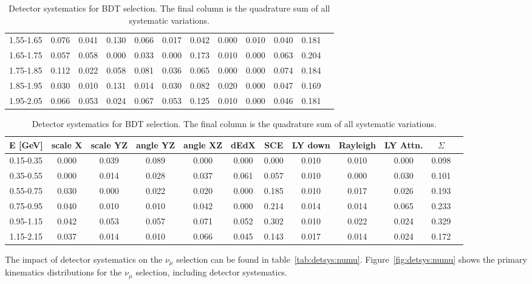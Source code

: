 \begin{table}[H]
\begin{tabular}{| c | c | c | c | c | c | c | c | c | c | c | c |}
1.55-1.65 & 0.076 & 0.041 & 0.130 & 0.066 & 0.017 & 0.042 & 0.000 & 0.010 & 0.040 &  0.181 \\
1.65-1.75 & 0.057 & 0.058 & 0.000 & 0.033 & 0.000 & 0.173 & 0.010 & 0.000 & 0.063 &  0.204 \\
1.75-1.85 & 0.112 & 0.022 & 0.058 & 0.081 & 0.036 & 0.065 & 0.000 & 0.000 & 0.074 &  0.184 \\
1.85-1.95 & 0.030 & 0.010 & 0.131 & 0.014 & 0.030 & 0.082 & 0.020 & 0.000 & 0.047 &  0.169 \\
1.95-2.05 & 0.066 & 0.053 & 0.024 & 0.067 & 0.053 & 0.125 & 0.010 & 0.000 & 0.046 &  0.181 \\
 \hline
 \end{tabular}
 \caption{\label{tab:detsys:nue:BDT} Detector systematics for BDT \npsel selection. The final column is the quadrature sum of all systematic variations.}
\end{table}



\begin{table}[H]
\centering
\small
\setlength{\tabcolsep}{3pt}
\renewcommand{\arraystretch}{1.25}
 \begin{tabular}{| c | c | c | c | c | c | c | c | c | c | c | c |} 
 \hline
E [GeV] & scale X & scale YZ & angle YZ & angle XZ & dEdX & SCE & LY down & Rayleigh & LY Attn. & $\Sigma$ \\ \hline
0.15-0.35 & 0.000 & 0.039 & 0.089 & 0.000 & 0.000 & 0.000 & 0.010 & 0.010 & 0.000 &  0.098 \\
0.35-0.55 & 0.000 & 0.014 & 0.028 & 0.037 & 0.061 & 0.057 & 0.010 & 0.000 & 0.030 &  0.101 \\
0.55-0.75 & 0.030 & 0.000 & 0.022 & 0.020 & 0.000 & 0.185 & 0.010 & 0.017 & 0.026 &  0.193 \\
0.75-0.95 & 0.040 & 0.010 & 0.010 & 0.042 & 0.000 & 0.214 & 0.014 & 0.014 & 0.065 &  0.233 \\
0.95-1.15 & 0.042 & 0.053 & 0.057 & 0.071 & 0.052 & 0.302 & 0.010 & 0.022 & 0.024 &  0.329 \\
1.15-2.15 & 0.037 & 0.014 & 0.010 & 0.066 & 0.045 & 0.143 & 0.017 & 0.014 & 0.024 & 0.172 \\
 \hline
 \end{tabular}
 \caption{\label{tab:detsys:nue:BDT} Detector systematics for BDT \zpsel selection. The final column is the quadrature sum of all systematic variations.}
\end{table}



\par The impact of detector systematics on the $\nu_{\mu}$ selection can be found in table~\ref{tab:detsys:numu}. Figure~\ref{fig:detsys:numu} shows the primary kinematics distributions for the $\nu_{\mu}$ selection, including detector systematics.

